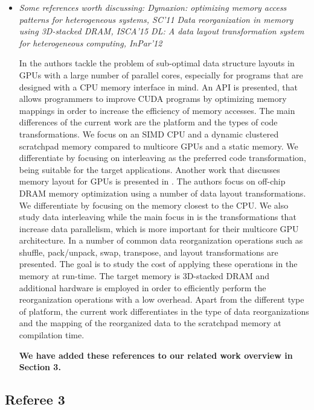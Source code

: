 \documentclass[12pt,a4paper,notitlepage]{article}
\begin{document}
\begin{itemize}
\item \textit{Some references worth discussing:
Dymaxion: optimizing memory access patterns for heterogeneous systems, SC'11
Data reorganization in memory using 3D-stacked DRAM, ISCA'15
DL: A data layout transformation system for heterogeneous computing, InPar'12}

In \cite{dymaxion} the authors tackle the problem of sub-optimal data structure layouts in GPUs with a large number of parallel cores, especially for programs that are designed with a CPU memory interface in mind. 
An API is presented, that allows programmers to improve CUDA programs by optimizing memory mappings in order to increase the efficiency of memory accesses. 
The main differences of the current work are the platform and the types of code transformations. 
We focus on an SIMD CPU and a dynamic clustered scratchpad memory compared to multicore GPUs and a static memory. 
We differentiate by focusing on interleaving as the preferred code transformation, being suitable for the target applications.
Another work that discusses memory layout for GPUs is presented in \cite{DL}.
The authors focus on off-chip DRAM memory optimization using a number of data layout transformations. 
We differentiate by focusing on the memory closest to the CPU. We also study data interleaving while the main focus in \cite{DL} is the transformations that increase data parallelism, which is more important for their multicore GPU architecture.
In \cite{3D} a number of common data reorganization operations such as shuffle, pack/unpack, swap, transpose, and layout transformations are presented. 
The goal is to study the cost of applying these operations in the memory at run-time. The target memory is 3D-stacked DRAM and additional hardware is employed in order to efficiently perform the reorganization operations with a low overhead. 
Apart from the different type of platform, the current work differentiates in the type of data reorganizations and the mapping of the reorganized data to the scratchpad memory at compilation time. 

\textbf{We have added these references to our related work overview in Section 3.}

\end{itemize}

\subsection*{Referee 3}
\end{document}
